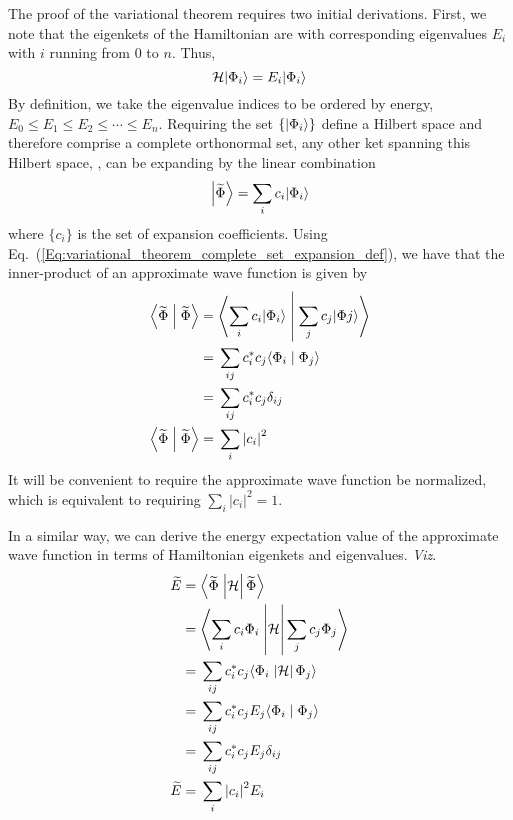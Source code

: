 The proof of the variational theorem requires two initial derivations. First, we note that the eigenkets of the Hamiltonian are  with corresponding eigenvalues $E_i$ with $i$ running from 0 to $n$. Thus,
%
\begin{equation}
  \displaystyle
  \mathcal{H}\ket{\Phi_i} = E_i\ket{\Phi_i}
\end{equation}
%
By definition, we take the eigenvalue indices to be ordered by energy, $E_0 \le{} E_1 \le{} E_2 \le{} \cdots \le{} E_n$. Requiring the set $\{\ket{\Phi_i}\}$ define a Hilbert space and therefore comprise a complete orthonormal set, any other ket spanning this Hilbert space, \ket{\widetilde{\Phi}}, can be expanding by the linear combination
%
\begin{equation}\label{Eq:variational_theorem_complete_set_expansion_def}
  \displaystyle
  \ket{\widetilde{\Phi}} = \sum_i{c_i\ket{\Phi_i}}
\end{equation}
%
where $\{c_i\}$ is the set of expansion coefficients. Using Eq.~(\ref{Eq:variational_theorem_complete_set_expansion_def}), we have that the inner-product of an approximate wave function \ket{\widetilde{\Phi}} is given by
%
\begin{equation}\label{Eq:variational_theorem_approx_wf_normalization}
  \displaystyle
  \begin{split}
    \braket{\widetilde{\Phi}}{\widetilde{\Phi}} ={}&
      \braket{\sum_i{c_i\ket{\Phi_i}}}{\sum_j{c_j\ket{\Phi{j}}}}   \\
    ={}& \sum_{ij}{c_i^*c_j\braket{\Phi_i}{\Phi_j}}   \\
    ={}& \sum_{ij}{c_i^*c_j\delta_{ij}}   \\
    \braket{\widetilde{\Phi}}{\widetilde{\Phi}} ={}&
      \sum_i{\left| c_i \right|^2}   \\
  \end{split}
\end{equation}
%
It will be convenient to require the approximate wave function be normalized, which is equivalent to requiring $\sum_i{\left| c_i \right|^2} = 1$.

In a similar way, we can derive the energy expectation value of the approximate wave function in terms of Hamiltonian eigenkets and eigenvalues. \emph{Viz}.
%
\begin{equation}\label{Eq:variational_theorem_approx_energy}
  \displaystyle
  \begin{split}
    \widetilde{E} ={}& \braketop{\widetilde{\Phi}}{\mathcal{H}}{\widetilde{\Phi}}   \\
      ={}& \braketop{\sum_i{c_i \Phi_i}}{\mathcal{H}}{\sum_j{c_j \Phi_j}}   \\
      ={}& \sum_{ij}{c_i^* c_j \braketop{\Phi_i}{\mathcal{H}}{\Phi_j}}   \\
      ={}& \sum_{ij}{c_i^* c_j E_j \braket{\Phi_i}{\Phi_j}}   \\
      ={}& \sum_{ij}{c_i^* c_j E_j \delta_{ij}}   \\
    \widetilde{E} ={}& \sum_{i}{\left| c_i \right|^2 E_i}   \\
  \end{split}
\end{equation}

